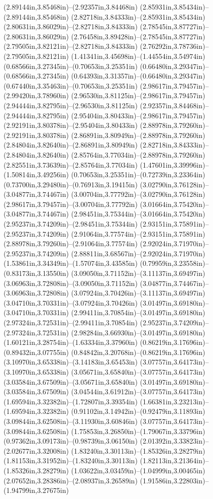 (2.89144in,3.85468in)--(2.92357in,3.84468in) (2.85931in,3.85434in)--(2.89144in,3.85468in) (2.82718in,3.84333in)--(2.85931in,3.85434in) (2.80631in,3.86029in)--(2.82718in,3.84333in) (2.78545in,3.87727in)--(2.80631in,3.86029in) (2.76458in,3.89428in)--(2.78545in,3.87727in) (2.79505in,3.82121in)--(2.82718in,3.84333in) (2.76292in,3.78736in)--(2.79505in,3.82121in) (1.41341in,3.45698in)--(1.44554in,3.54974in) (0.68566in,3.27345in)--(0.70653in,3.25351in) (0.66480in,3.29347in)--(0.68566in,3.27345in) (0.64393in,3.31357in)--(0.66480in,3.29347in) (0.67440in,3.35463in)--(0.70653in,3.25351in) (2.98617in,3.79457in)--(2.99420in,3.78960in) (2.96530in,3.81125in)--(2.98617in,3.79457in) (2.94444in,3.82795in)--(2.96530in,3.81125in) (2.92357in,3.84468in)--(2.94444in,3.82795in) (2.95404in,3.80433in)--(2.98617in,3.79457in) (2.92191in,3.80378in)--(2.95404in,3.80433in) (2.88978in,3.79260in)--(2.92191in,3.80378in) (2.86891in,3.80949in)--(2.88978in,3.79260in) (2.84804in,3.82640in)--(2.86891in,3.80949in) (2.82718in,3.84333in)--(2.84804in,3.82640in) (2.85764in,3.77034in)--(2.88978in,3.79260in) (2.82551in,3.73639in)--(2.85764in,3.77034in) (1.47601in,3.39996in)--(1.50814in,3.49256in) (0.70653in,3.25351in)--(0.72739in,3.23364in) (0.73700in,3.29480in)--(0.76913in,3.19415in) (3.02790in,3.76128in)--(3.04877in,3.74467in) (3.00704in,3.77792in)--(3.02790in,3.76128in) (2.98617in,3.79457in)--(3.00704in,3.77792in) (3.01664in,3.75420in)--(3.04877in,3.74467in) (2.98451in,3.75344in)--(3.01664in,3.75420in) (2.95237in,3.74209in)--(2.98451in,3.75344in) (2.93151in,3.75891in)--(2.95237in,3.74209in) (2.91064in,3.77574in)--(2.93151in,3.75891in) (2.88978in,3.79260in)--(2.91064in,3.77574in) (2.92024in,3.71970in)--(2.95237in,3.74209in) (2.88811in,3.68567in)--(2.92024in,3.71970in) (1.53861in,3.34349in)--(1.57074in,3.43585in) (0.79959in,3.23558in)--(0.83173in,3.13550in) (3.09050in,3.71152in)--(3.11137in,3.69497in) (3.06963in,3.72808in)--(3.09050in,3.71152in) (3.04877in,3.74467in)--(3.06963in,3.72808in) (3.07924in,3.70426in)--(3.11137in,3.69497in) (3.04710in,3.70331in)--(3.07924in,3.70426in) (3.01497in,3.69180in)--(3.04710in,3.70331in) (2.99411in,3.70854in)--(3.01497in,3.69180in) (2.97324in,3.72531in)--(2.99411in,3.70854in) (2.95237in,3.74209in)--(2.97324in,3.72531in) (2.98284in,3.66930in)--(3.01497in,3.69180in) (1.60121in,3.28754in)--(1.63334in,3.37960in) (0.86219in,3.17696in)--(0.89432in,3.07755in) (0.84842in,3.20768in)--(0.86219in,3.17696in) (3.10970in,3.65338in)--(3.14183in,3.65453in) (3.07757in,3.64173in)--(3.10970in,3.65338in) (3.05671in,3.65840in)--(3.07757in,3.64173in) (3.03584in,3.67509in)--(3.05671in,3.65840in) (3.01497in,3.69180in)--(3.03584in,3.67509in) (3.04544in,3.61912in)--(3.07757in,3.64173in) (1.69594in,3.32382in)--(1.72807in,3.39354in) (1.66381in,3.23213in)--(1.69594in,3.32382in) (0.91102in,3.14942in)--(0.92479in,3.11893in) (3.09844in,3.62508in)--(3.11930in,3.60846in) (3.07757in,3.64173in)--(3.09844in,3.62508in) (1.75853in,3.26850in)--(1.79067in,3.33796in) (0.97362in,3.09173in)--(0.98739in,3.06150in) (2.01392in,3.33823in)--(2.02677in,3.32008in) (1.83240in,3.30113in)--(1.85326in,3.28279in) (1.81153in,3.31952in)--(1.83240in,3.30113in) (1.82113in,3.21364in)--(1.85326in,3.28279in) (1.03622in,3.03459in)--(1.04999in,3.00465in) (2.07652in,3.28386in)--(2.08937in,3.26589in) (1.91586in,3.22803in)--(1.94799in,3.27675in) 